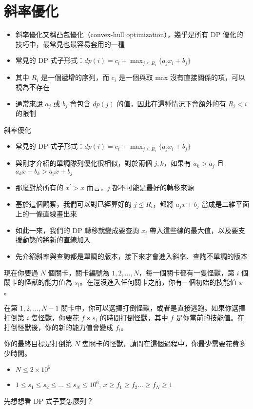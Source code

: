 \documentclass[standalone]{beamer}
\begin{document}
\section{斜率優化}

\begin{frame}{}
  \begin{itemize}
    \item 斜率優化又稱凸包優化（convex-hull optimization），幾乎是所有 DP 優化的技巧中，最常見也最容易套用的一種
    \item 常見的 DP 式子形式：$dp(i) = c_i + \max_{j \leq R_i} \{a_jx_i + b_j\}$
    \item 其中 $R_i$ 是一個遞增的序列，而 $c_i$ 是一個與取 max 沒有直接關係的項，可以視為不存在
    \item 通常來說 $a_j$ 或 $b_j$ 會包含 $dp(j)$ 的值，因此在這種情況下會額外的有 $R_i < i$ 的限制
  \end{itemize}
\end{frame}

\begin{frame}{斜率優化}
  \begin{itemize}
    \item 常見的 DP 式子形式：$dp(i) = c_i + \max_{j \leq R_i} \{a_jx_i + b_j\}$
    \item 與剛才介紹的單調隊列優化很相似，對於兩個 $j, k$，如果有 $a_k > a_j$ 且 $a_kx + b_k > a_jx + b_j$
    \item 那麼對於所有的 $x^\prime > x$ 而言，$j$ 都不可能是最好的轉移來源
    \item 基於這個觀察，我們可以對已經算好的 $j \leq R_i$，都將 $a_jx + b_j$ 當成是二維平面上的一條直線畫出來
    \item 如此一來，我們的 DP 轉移就變成要查詢 $x_i$ 帶入這些線的最大值，以及要支援動態的將新的直線加入
    \item 先介紹斜率與查詢都是單調的版本，接下來才會進入斜率、查詢不單調的版本
  \end{itemize}
\end{frame}

\begin{frame}{}
  \begin{problem}
    現在你要過 $N$ 個關卡，關卡編號為 $1, 2, \dots, N$，每一個關卡都有一隻怪獸，第 $i$ 個關卡的怪獸的能力值為 $s_i$。在還沒進入任何關卡之前，你有一個初始的技能值 $x$。

    在第 $1, 2, \dots, N - 1$ 關卡中，你可以選擇打倒怪獸，或者是直接逃跑。如果你選擇打倒第 $i$ 隻怪獸，你要花 $f \times s_i$ 的時間打倒怪獸，其中 $f$ 是你當前的技能值。在打倒怪獸後，你的新的能力值會變成 $f_i$。

    你的最終目標是打倒第 $N$ 隻關卡的怪獸，請問在這個過程中，你最少需要花費多少時間。

    \begin{itemize}
      \item $N \leq 2 \times 10^5$
      \item $1 \leq s_1 \leq s_2 \leq \dots \leq s_N \leq 10^6$, $x \geq f_1 \geq f_2 \dots \geq f_N \geq 1$
    \end{itemize}
  \end{problem}
  先想想看 DP 式子要怎麼列？
\end{frame}
\end{document}
